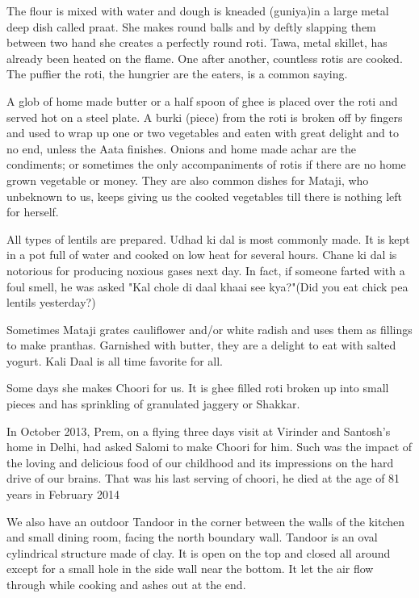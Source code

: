 The flour is mixed with water and dough is kneaded (guniya)in a large
metal deep dish called praat. She makes round balls and by deftly slapping
them between two hand she creates a perfectly round roti. Tawa, metal
skillet, has already been heated on the flame. One after another,
countless rotis are cooked. The puffier the roti, the hungrier are the
eaters, is a common saying. 

A glob of home made butter or a half spoon of ghee is placed over the roti
and served hot on a steel plate. A burki (piece) from the roti is broken
off by fingers and used to wrap up one or two vegetables and eaten with
great delight and to no end, unless the Aata finishes. Onions and home
made achar are the condiments; or sometimes the only accompaniments of
rotis if there are no home grown vegetable or money. They are also common
dishes for Mataji, who unbeknown to us, keeps giving us the cooked
vegetables till there is nothing left for herself. 

All types of lentils are prepared. Udhad ki dal is most commonly made. It
is kept in a pot full of water and cooked on low heat for several hours.
Chane ki dal is notorious for producing noxious gases next day. In fact,
if someone farted with a foul smell, he was asked "Kal chole di daal khaai
see kya?"(Did you eat chick pea lentils yesterday?)

Sometimes Mataji grates cauliflower and/or white radish and uses them as
fillings to make pranthas. Garnished with butter, they are a delight to
eat with salted yogurt. Kali Daal is all time favorite for all. 

Some days she makes Choori for us. It is ghee filled roti broken up into
small pieces and has sprinkling of granulated jaggery or Shakkar. 

In October 2013, Prem, on a flying three days visit at Virinder and
Santosh's home in Delhi, had asked Salomi to make Choori for him. Such was
the impact of the loving and delicious food of our childhood and its
impressions on the hard drive of our brains. That was his last serving of
choori, he died at the age of 81 years in February 2014 

We also have an outdoor Tandoor in the corner between the walls of the
kitchen and small dining room, facing the north boundary wall. Tandoor is
an oval cylindrical structure made of clay. It is open on the top and
closed all around except for a small hole in the side wall near the
bottom. It let the air flow through while cooking and ashes out at the
end. 

